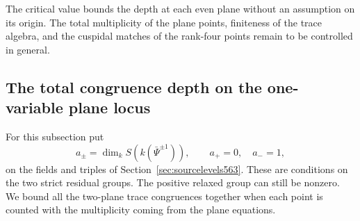 \documentclass[a4paper,11pt]{article}
\theoremstyle{definition}
\theoremstyle{remark}
\numberwithin{equation}{section}
\begin{document}
The critical value bounds the depth at each even plane without
an assumption on its origin. The total multiplicity of the plane
points, finiteness of the trace algebra, and the cuspidal matches
of the rank-four points remain to be controlled in general.


\subsection{The total congruence depth on the one-variable plane locus}
\label{sec:totalplane567}

For this subsection put
\[
 a_\pm=\dim_k S(k(\bar\Psi^{\pm1})),\qquad
                 a_+=0,\quad a_-=1,
\]
on the fields and triples of Section~\ref{sec:sourcelevels563}.
These are conditions on the two strict residual groups. The
positive relaxed group can still be nonzero. We bound all the
two-plane trace congruences together when each point is counted
with the multiplicity coming from the plane equations.
\end{document}
